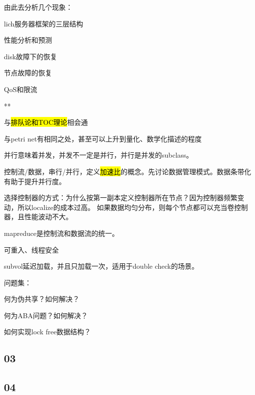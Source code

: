 由此去分析几个现象：
\begin{enumbox}
\item lich服务器框架的三层结构
\item 性能分析和预测
\item disk故障下的恢复
\item 节点故障的恢复
\item QoS和限流
\item ***
\item 与\hl{排队论和TOC理论}相会通
\item 与petri net有相同之处，甚至可以上升到量化、数学化描述的程度
\end{enumbox}

并行意味着并发，并发不一定是并行，并行是并发的subclass。

控制流/数据，串行/并行，定义\hl{加速比}的概念。先讨论数据管理模式。数据条带化有助于提升并行度。

选择控制器的方式：为什么按第一副本定义控制器所在节点？因为控制器频繁变动，所以localize的成本过高。
如果数据均匀分布，则每个节点都可以充当卷控制器，且性能波动不大。

mapreduce是控制流和数据流的统一。

可重入、线程安全

subvol延迟加载，并且只加载一次，适用于double check的场景。

问题集：
\begin{enumbox}
\item 何为伪共享？如何解决？
\item 何为ABA问题？如何解决？
\item 如何实现lock free数据结构？
\end{enumbox}

\subsection{03}

\subsection{04}
